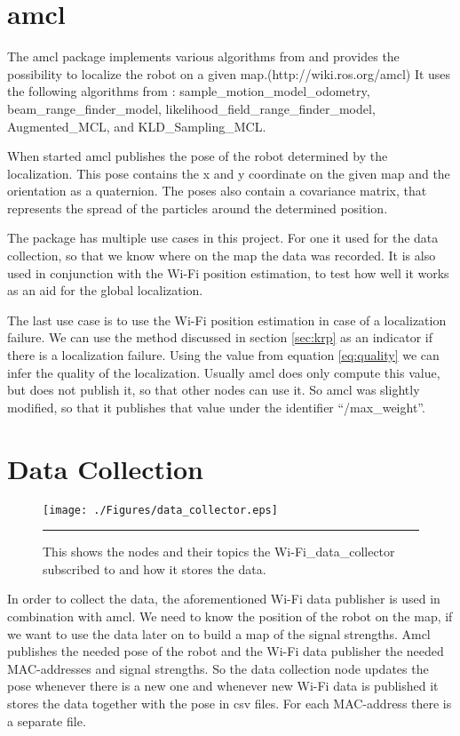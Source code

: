 \section{amcl}
The amcl package implements various algorithms from \cite{Thrun:2005:PR:1121596} and provides the possibility to localize the robot on a given map.(http://wiki.ros.org/amcl) It uses the following algorithms from \cite{Thrun:2005:PR:1121596}: sample\_motion\_model\_odometry, \\beam\_range\_finder\_model, likelihood\_field\_range\_finder\_model, Augmented\_MCL, and KLD\_Sampling\_MCL.

When started amcl publishes the pose of the robot determined by the localization. This pose contains the x and y coordinate on the given map and the orientation as a quaternion. The poses also contain a covariance matrix, that represents the spread of the particles around the determined position.

The package has multiple use cases in this project. For one it used for the data collection, so that we know where on the map the data was recorded. It is also used in conjunction with the Wi-Fi position estimation, to test how well it works as an aid for the global localization. 

The last use case is to use the Wi-Fi position estimation in case of a localization failure. We can use the method discussed in section \ref{sec:krp} as an indicator if there is a localization failure. Using the value from equation \ref{eq:quality} we can infer the quality of the localization. Usually amcl does only compute this value, but does not publish it, so that other nodes can use it. So amcl was slightly modified, so that it publishes that value under the identifier ``/max\_weight''.

\section{Data Collection}
\begin{figure}[htbp]
	\centering
		\texttt{[image: ./Figures/data\_collector.eps]}
		\rule{35em}{0.5pt}
	\caption[Diagram of wifi\_data\_collector]{This shows the nodes and their topics the Wi-Fi\_data\_collector subscribed to and how it stores the data.}
	\label{fig:data_collector}
\end{figure}
In order to collect the data, the aforementioned Wi-Fi data publisher is used in combination with amcl. We need to know the position of the robot on the map, if we want to use the data later on to build a map of the signal strengths. Amcl publishes the needed pose of the robot and the Wi-Fi data publisher the needed MAC-addresses and signal strengths. So the data collection node updates the pose whenever there is a new one and whenever new Wi-Fi data is published it stores the data together with the pose in csv files. For each MAC-address there is a separate file.
 
